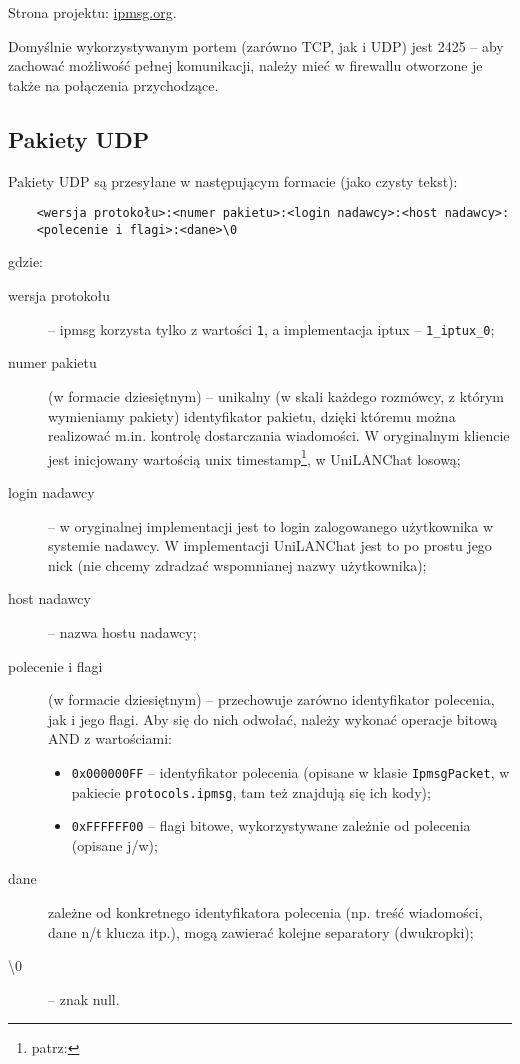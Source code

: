 \documentclass[11pt,leqno]{article}
\begin{document}
Strona projektu: \href{http://ipmsg.org}{ipmsg.org}.

Domyślnie wykorzystywanym portem (zarówno TCP, jak i UDP) jest 2425 -- aby zachować możliwość
pełnej komunikacji, należy mieć w firewallu otworzone je także na połączenia przychodzące.

\subsection{Pakiety UDP}

Pakiety UDP są przesyłane w następującym formacie (jako czysty tekst):
\begin{verbatim}
	<wersja protokołu>:<numer pakietu>:<login nadawcy>:<host nadawcy>:
	<polecenie i flagi>:<dane>\0
\end{verbatim}
gdzie:
\begin{description}
	\item[wersja protokołu] -- ipmsg korzysta tylko z wartości \texttt{1}, a implementacja
	iptux -- \texttt{1\_iptux\_0};
	\item[numer pakietu] (w formacie dziesiętnym) -- unikalny (w skali każdego rozmówcy, z którym
	wymieniamy pakiety) identyfikator pakietu, dzięki któremu można realizować m.in. kontrolę
	dostarczania wiadomości. W oryginalnym kliencie jest inicjowany wartością
	unix timestamp\footnote{patrz: }, w UniLANChat losową;
	\item[login nadawcy] -- w oryginalnej implementacji jest to login zalogowanego
	użytkownika w systemie nadawcy. W implementacji UniLANChat jest to po prostu jego nick (nie
	chcemy zdradzać wspomnianej nazwy użytkownika);
	\item[host nadawcy] -- nazwa hostu nadawcy;
	\item[polecenie i flagi] (w formacie dziesiętnym) -- przechowuje zarówno identyfikator polecenia, jak i jego
	flagi. Aby się do nich odwołać, należy wykonać operacje bitową AND z wartościami:
	\begin{itemize}
		\item \texttt{0x000000FF} -- identyfikator polecenia (opisane w klasie \texttt{IpmsgPacket},
		w pakiecie \texttt{protocols.ipmsg}, tam też znajdują się ich kody);
		\item \texttt{0xFFFFFF00} -- flagi bitowe, wykorzystywane zależnie od polecenia (opisane j/w);
	\end{itemize}
	\item[dane] zależne od konkretnego identyfikatora polecenia (np. treść wiadomości,
	dane n/t klucza itp.), mogą zawierać kolejne separatory (dwukropki);
	\item[\textbackslash0] -- znak null.
\end{description}
\end{document}
